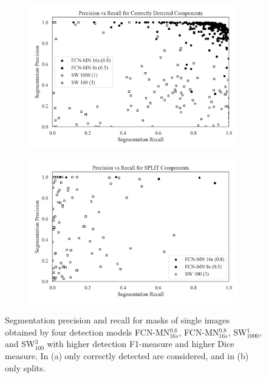 \documentclass[a4paper,authoryear,review]{elsarticle}
\begin{document}
\begin{figure}%
	\centering
	\begin{subfigure}[b]{0.45\textwidth}
		\centering
		\includegraphics[width=\textwidth]{figures/ZZZ_correctly_detected.png}
		\caption{}
		\label{fig:ZZZ-a}
	\end{subfigure}
	\hfill
	\begin{subfigure}[b]{0.45\textwidth}
		\centering
		\includegraphics[width=\textwidth]{figures/ZZZ_splits.png}
		\caption{}
		\label{fig:ZZZ-b}
	\end{subfigure}
	\caption{ Segmentation precision and recall for masks of single images obtained by four detection models FCN-MN$_{16s}^{0.6}$,  FCN-MN$_{16s}^{0.8}$, SW$_{1000}^{1}$, and SW$_{100}^{3}$ with higher detection F1-measure and higher Dice measure. In  (a) only correctly detected are considered, and in (b) only splits.}%
	\label{fig:ZZZ}%
\end{figure}
\end{document}
